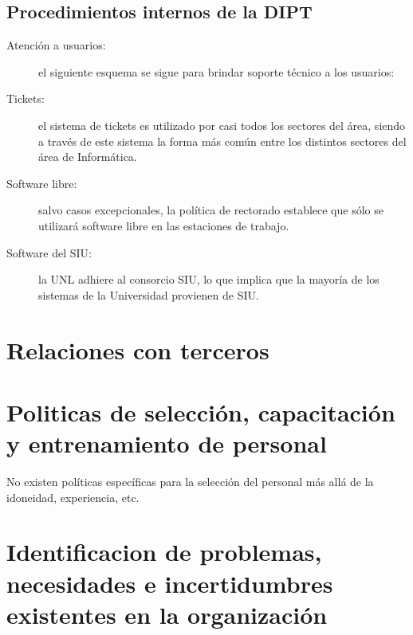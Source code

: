 \documentclass[a4paper,11pt,oneside]{article}
\begin{document}
\subsection*{Procedimientos internos de la DIPT}
%
\begin{description}
\item[Atención a usuarios:] el siguiente esquema se sigue para brindar
  soporte técnico a los usuarios:
\item[Tickets:] el sistema de tickets es utilizado por casi todos los
  sectores del área, siendo a través de este sistema la forma más
  común entre los distintos sectores del área de Informática.
\item[Software libre:] salvo casos excepcionales, la política de
  rectorado establece que sólo se utilizará software libre en las
  estaciones de trabajo.
\item[Software del SIU:] la UNL adhiere al consorcio SIU, lo que
  implica que la mayoría de los sistemas de la Universidad provienen
  de SIU.
\end{description}
%
\section{Relaciones con terceros}

\section{Politicas de selección, capacitación y entrenamiento de personal}

No existen políticas específicas para la selección del personal más allá de la idoneidad, experiencia, etc.

\section{Identificacion de problemas, necesidades e incertidumbres existentes en la organización}
\end{document}
